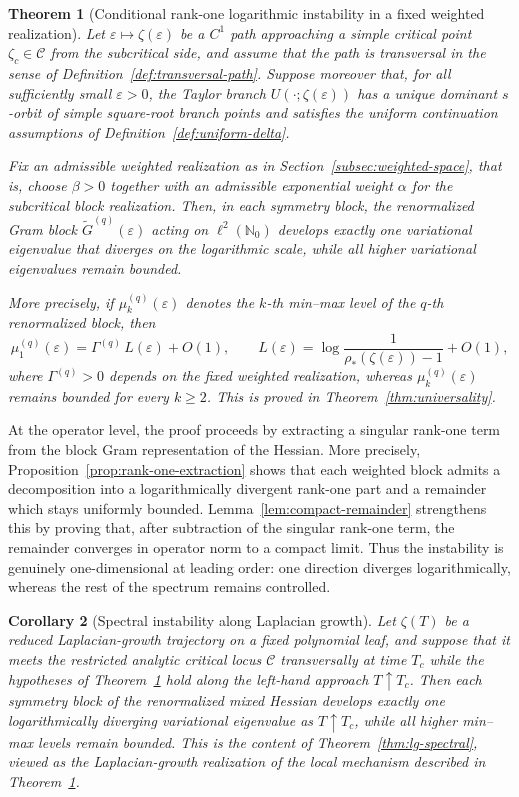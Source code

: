 \documentclass[11pt]{amsart}
\numberwithin{equation}{section}
\theoremstyle{plain}
\newtheorem{maintheorem}{Theorem}
\newtheorem{maincorollary}[maintheorem]{Corollary}
\theoremstyle{definition}
\theoremstyle{remark}
\begin{document}
\begin{maintheorem}[Conditional rank-one logarithmic instability in a fixed weighted realization]
\label{thm:A}
Let \(\varepsilon \mapsto \zeta(\varepsilon)\) be a \(C^{1}\) path approaching a
simple critical point \(\zeta_{c}\in\mathcal C\) from the subcritical side, and
assume that the path is transversal in the sense of
Definition~\ref{def:transversal-path}. Suppose moreover that, for all
sufficiently small \(\varepsilon>0\), the Taylor branch
\(U(\cdot;\zeta(\varepsilon))\) has a unique dominant \(s\)-orbit of simple
square-root branch points and satisfies the uniform continuation assumptions of
Definition~\ref{def:uniform-delta}.

Fix an admissible weighted realization as in
Section~\ref{subsec:weighted-space}, that is, choose \(\beta>0\) together
with an admissible exponential weight \(\alpha\) for the subcritical block
realization. Then, in each symmetry block, the renormalized Gram block
\(\widetilde G^{(q)}(\varepsilon)\) acting on \(\ell^2(\mathbb N_0)\) develops
exactly one variational eigenvalue that diverges on the logarithmic scale,
while all higher variational eigenvalues remain bounded.


More precisely, if \(\mu_{k}^{(q)}(\varepsilon)\) denotes the \(k\)-th min--max
level of the \(q\)-th renormalized block, then
\[
\mu_{1}^{(q)}(\varepsilon)
=
\Gamma^{(q)}\,L(\varepsilon)+O(1),
\qquad
L(\varepsilon)
=
\log\frac{1}{\rho_{*}(\zeta(\varepsilon))-1}+O(1),
\]
where \(\Gamma^{(q)}>0\) depends on the fixed weighted realization, whereas
\(\mu_{k}^{(q)}(\varepsilon)\) remains bounded for every \(k\ge 2\). This is
proved in Theorem~\ref{thm:universality}.
\end{maintheorem}

At the operator level, the proof proceeds by extracting a singular rank-one
term from the block Gram representation of the Hessian. More precisely,
Proposition~\ref{prop:rank-one-extraction} shows that each weighted block
admits a decomposition into a logarithmically divergent rank-one part and a
remainder which stays uniformly bounded. Lemma~\ref{lem:compact-remainder}
strengthens this by proving that, after subtraction of the singular rank-one
term, the remainder converges in operator norm to a compact limit. Thus the
instability is genuinely one-dimensional at leading order: one direction
diverges logarithmically, whereas the rest of the spectrum remains controlled.


\begin{maincorollary}[Spectral instability along Laplacian growth]
\label{cor:B}
Let \(\zeta(T)\) be a reduced Laplacian-growth trajectory on a fixed
polynomial leaf, and suppose that it meets the restricted analytic critical
locus \(\mathcal C\) transversally at time \(T_c\) while the hypotheses of
Theorem~\ref{thm:A} hold along the left-hand approach \(T\uparrow T_c\). Then
each symmetry block of the renormalized mixed Hessian develops exactly one
logarithmically diverging variational eigenvalue as \(T\uparrow T_c\), while
all higher min--max levels remain bounded. This is the content of
Theorem~\ref{thm:lg-spectral}, viewed as the Laplacian-growth realization of
the local mechanism described in Theorem~\ref{thm:A}.
\end{maincorollary}
\end{document}
